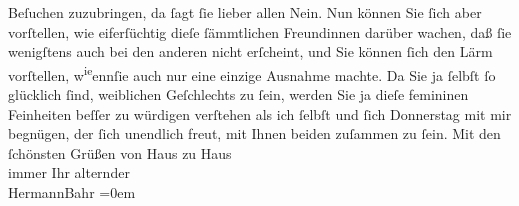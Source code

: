 \begin{ledgroupsized}[t]{13cm}
                    Beſuchen zuzubringen, da ſagt ſie lieber allen Nein. Nun können Sie ſich aber
                    vorſtellen, wie eiferſüchtig {\pb}dieſe
                    ſämmtlichen Freundinnen darüber wachen, daß ſie wenigſtens auch bei den anderen
                    nicht erſcheint, und Sie können ſich den Lärm vorſtellen, w\substVorne{}\textsuperscript{ie}\substDazwischen{}enn\substHinten{}{ }ſie auch nur eine einzige
                    Ausnahme machte. Da Sie ja ſelbſt ſo glücklich ſind, weiblichen Geſchlechts zu
                    ſein, werden Sie ja dieſe femininen Feinheiten beſſer zu würdigen verſtehen als
                    ich ſelbſt und ſich Donnerstag mit mir begnügen, der ſich unendlich
                    freut, mit Ihnen beiden
                    zuſammen zu ſein.\pend
           \pstart
           Mit den ſchönsten Grüßen von Haus zu Haus{\\[\baselineskip]}immer Ihr alternder{\\[\baselineskip]}\spacefill\mbox{HermannBahr}\pend
           \leftskip=0em{}
         
         \endnumbering{}\end{ledgroupsized}  \newcommand{\dateiname}{L02060}\newcommand{\titel}{Hermann Bahr an Olga Schnitzler, 27. 4. 1912}\newcommand{\editorInnen}{Martin Anton Müller und Gerd-Hermann Susen}
      